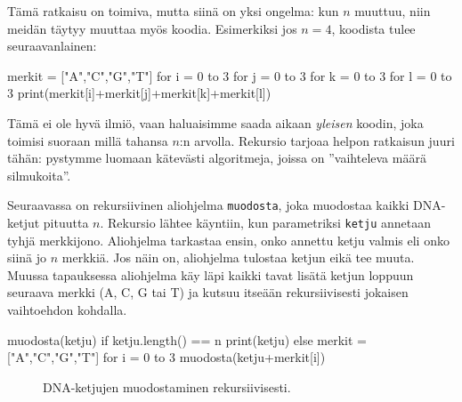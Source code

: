 Tämä ratkaisu on toimiva, mutta siinä on yksi ongelma:
kun $n$ muuttuu, niin meidän täytyy muuttaa myös koodia.
Esimerkiksi jos $n=4$, koodista tulee seuraavanlainen:

\begin{code}
merkit = ["A","C","G","T"]
for i = 0 to 3
    for j = 0 to 3
        for k = 0 to 3
            for l = 0 to 3
                print(merkit[i]+merkit[j]+merkit[k]+merkit[l])
\end{code}

Tämä ei ole hyvä ilmiö, vaan haluaisimme saada aikaan \emph{yleisen}
koodin, joka toimisi suoraan millä tahansa $n$:n arvolla.
Rekursio tarjoaa helpon ratkaisun juuri tähän:
pystymme luomaan kätevästi algoritmeja, joissa on
''vaihteleva määrä silmukoita''.

Seuraavassa on rekursiivinen aliohjelma \texttt{muodosta},
joka muodostaa kaikki DNA-ketjut pituutta $n$.
Rekursio lähtee käyntiin, kun parametriksi \texttt{ketju}
annetaan tyhjä merkkijono.
Aliohjelma tarkastaa ensin, onko annettu ketju valmis
eli onko siinä jo $n$ merkkiä.
Jos näin on, aliohjelma tulostaa ketjun eikä tee muuta.
Muussa tapauksessa aliohjelma käy läpi kaikki tavat
lisätä ketjun loppuun seuraava merkki (A, C, G tai T)
ja kutsuu itseään rekursiivisesti jokaisen vaihtoehdon kohdalla.

\begin{code}
muodosta(ketju)
    if ketju.length() == n
        print(ketju)
    else
        merkit = ["A","C","G","T"]
        for i = 0 to 3
            muodosta(ketju+merkit[i])
\end{code}

\begin{figure}
\center
{}
\caption{DNA-ketjujen muodostaminen rekursiivisesti.}
\label{fig:ketjut}
\end{figure}

